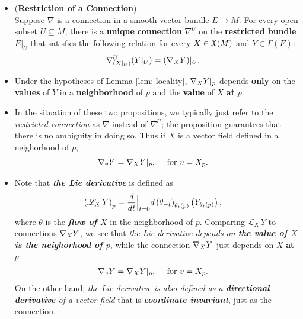 \documentclass[11pt]{article}
\begin{document}
\begin{itemize}
\item \begin{proposition} (\textbf{Restriction of a Connection}).\citep{lee2018introduction} \\
Suppose $\nabla$ is a connection in a smooth vector bundle  $E \rightarrow M$. For every open subset $U \subseteq M$, there is a \textbf{unique} \textbf{connection} $\nabla^{U}$ on the \textbf{restricted bundle} $E|_{U}$ that satisfies the following relation for every $X \in {\mathfrak X}(M)$ and $Y\in \Gamma(E)$:
\begin{align}
\nabla^U_{(X|_{U})}(Y|_{U}) &= (\nabla_{X}{Y})|_{U}.  \label{eqn: connection_restriction}
\end{align}
\end{proposition}

\item \begin{proposition}
Under the hypotheses of Lemma \ref{lem: locality}, $\nabla_{X}{Y}|_{p}$ depends \textbf{only} on the \textbf{values} of $Y$ in a \textbf{neighborhood} of $p$ and the \textbf{value} of $X$ \textbf{at} $p$.
\end{proposition}

\item \begin{remark}
In the situation of these two propositions, we typically just refer to the \emph{restricted connection} as $\nabla$ instead of $\nabla^U$; the proposition guarantees that there is no ambiguity in doing so. Thus if $X$ is a vector field defined in a neighorhood of $p$, 
\begin{align*}
\nabla_{v}{Y} &= \nabla_{X}{Y}|_{p}, \quad \text{ for }v = X_p.
\end{align*}
\end{remark}

\item \begin{remark}
Note that \emph{\textbf{the Lie derivative}} is defined as
\begin{align*}
\left(\mathscr{L}_{X}\,Y\right)_{p}  &= \frac{d}{dt}\Bigr|_{t=0} d\left(\theta_{-t}\right)_{\theta_{t}(p)}\left(Y_{\theta_t(p)}\right)  \nonumber,
\end{align*} where $\theta$ is the \emph{\textbf{flow of $X$}} in the neighborhood of $p$.
Comparing $\mathscr{L}_{X}\,Y$ to connections $\nabla_{X}{Y}$, we see that \emph{the Lie derivative depends on \textbf{the value of $X$ is the neighorhood of $p$}}, while the connection $\nabla_{X}{Y}$ just depends on $X$ \textbf{at} $p$:
\begin{align*}
\nabla_{v}{Y} &= \nabla_{X}{Y}|_{p}, \quad \text{ for }v = X_p.
\end{align*} On the other hand, \emph{the Lie derivative is also defined as a \textbf{directional derivative} of a vector field} that is \emph{\textbf{coordinate invariant}}, just as the connection. 


\end{remark}
\end{itemize}
\end{document}

